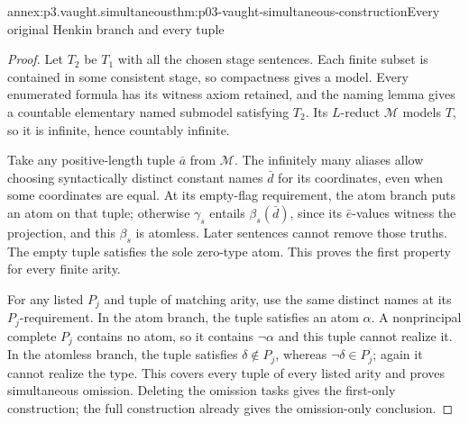 \begin{annexitem}{annex:p3.vaught.simultaneous}{thm:p03-vaught-simultaneous-construction}{Every original Henkin branch and every tuple}
\begin{proof}
Let \(T_2\) be \(T_1\) with all the chosen stage sentences.
Each finite subset is contained in some consistent stage, so
compactness gives a model. Every enumerated formula has its witness
axiom retained, and the naming lemma gives a countable elementary
named submodel satisfying \(T_2\). Its \(L\)-reduct \(\mathcal M\)
models \(T\), so it is infinite, hence countably infinite.

Take any positive-length tuple \(\bar a\) from \(\mathcal M\).
The infinitely many aliases allow choosing syntactically distinct
constant names \(\bar d\) for its coordinates, even when some
coordinates are equal. At its empty-flag requirement, the atom
branch puts an atom on that tuple; otherwise \(\gamma_s\) entails
\(\beta_s(\bar d)\), since its \(\bar e\)-values witness the projection,
and this \(\beta_s\) is atomless. Later sentences cannot remove those
truths. The empty tuple satisfies the sole zero-type atom.
This proves the first property for every finite arity.

For any listed \(P_j\) and tuple of matching arity, use the same
distinct names at its \(P_j\)-requirement. In the atom branch,
the tuple satisfies an atom \(\alpha\). A nonprincipal complete
\(P_j\) contains no atom, so it contains \(\neg\alpha\) and this tuple
cannot realize it. In the atomless branch, the tuple satisfies
\(\delta\notin P_j\), whereas \(\neg\delta\in P_j\); again it cannot
realize the type. This covers every tuple of every listed arity
and proves simultaneous omission.
Deleting the omission tasks gives the first-only construction;
the full construction already gives the omission-only conclusion.
\end{proof}
\end{annexitem}

